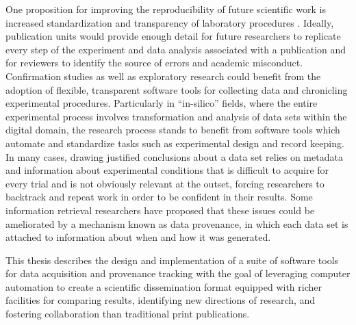 One proposition for improving the
reproducibility of future scientific work is increased standardization and
transparency of laboratory procedures
\cite{10.1371/journal.pmed.0020124}. Ideally, publication
units would provide enough detail for future researchers to replicate
every step of the experiment and data analysis associated with a
publication and for reviewers to identify the source of errors and
academic misconduct. Confirmation studies as well as exploratory
research could benefit from the adoption of flexible, transparent
software tools for collecting data and chronicling experimental
procedures. Particularly in ``in-silico'' fields, where the entire
experimental process involves transformation and analysis of data sets
within the digital domain, the research process stands to benefit from
software tools which automate and standardize tasks such as
experimental design and record keeping. In many cases, drawing
justified conclusions about a data set relies on
metadata and information about experimental conditions that is
difficult to acquire for every trial and is not obviously
relevant at the outset, forcing researchers to backtrack and repeat
work in order to be confident in their results. Some information
retrieval researchers have proposed that these issues could be
ameliorated by a mechanism known as data provenance, in which each
data set is attached to information about when and how it was
generated.

This thesis describes the design and implementation of a suite of
software tools for data acquisition and provenance
tracking with the goal of leveraging computer automation to create a
scientific dissemination format equipped with richer facilities for
comparing results, identifying new directions of research, and fostering
collaboration than traditional print publications.
